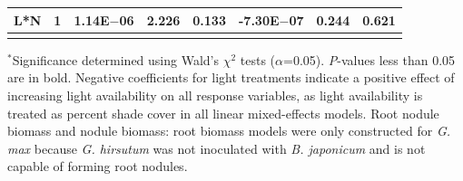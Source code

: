 \begin{landscape}
\begin{table}
\begin{tabular}{p{2.4cm}p{0.5cm}p{2cm}p{1.5cm}p{1.5cm}p{2cm}p{1.5cm}p{1.5cm}}
        L*N & \multicolumn{1}{r}{1}
        &  \multicolumn{1}{r}{1.14E$-$06}     &   \multicolumn{1}{r}{2.226}           & \multicolumn{1}{r}{0.133}
        & \multicolumn{1}{r}{-7.30E$-$07}     &   \multicolumn{1}{r}{0.244}           & \multicolumn{1}{r}{0.621}
        \\
        \hline
        \\
    \end{tabular}%
    \label{tab:table2.2}
\end{table}
\begin{singlespace}
    \noindent $^*$Significance determined using Wald’s $\chi^{2}$ tests ($\alpha$=0.05). \textit{P}-values less than 0.05 are in bold. Negative coefficients for light treatments indicate a positive effect of increasing light availability on all response variables, as light availability is treated as percent shade cover in all linear mixed-effects models. Root nodule biomass and nodule biomass: root biomass models were only constructed for \textit{G. max} because \textit{G. hirsutum} was not inoculated with \textit{B. japonicum} and is not capable of forming root nodules.
\end{singlespace}
\end{landscape}
\clearpage

